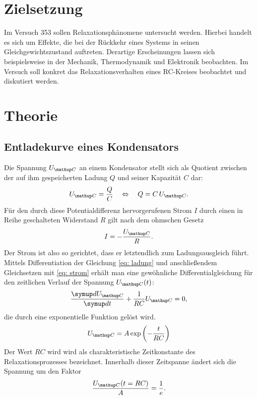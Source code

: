 \setcounter{page}{1}
\section*{Zielsetzung}
Im Versuch 353 sollen Relaxationsphänomene untersucht werden. Hierbei handelt es sich um Effekte, die bei der Rückkehr eines
Systems in seinen Gleichgewichtszustand auftreten. Derartige Erscheinungen lassen sich beispielsweise in der Mechanik, Thermodynamik
und Elektronik beobachten. Im Versuch soll konkret das Relaxationsverhalten eines RC-Kreises beobachtet und diskutiert werden.
\section{Theorie}
\subsection{Entladekurve eines Kondensators}
Die Spannung $U\ua{C}$ an einem Kondensator stellt sich als Quotient zwischen der auf ihm gespeicherten Ladung $Q$ und seiner Kapazität $C$ dar:
\begin{equation}
  U\ua{C} = \frac{Q}{C} \quad \Leftrightarrow \quad Q = C\, U\ua{C}.
  \label{eq: ladung}
\end{equation}
Für den durch diese Potentialdifferenz hervorgerufenen Strom $I$ durch einen in Reihe geschalteten Widerstand $R$ gilt nach dem ohmschen Gesetz
\begin{equation}
  I = -\frac{U\ua{C}}{R}.
  \label{eq: strom}
\end{equation}
Der Strom ist also so gerichtet, dass er letztendlich zum Ladungsausgleich führt. Mittels Differentiation der Gleichung \eqref{eq: ladung} und anschließendem
Gleichsetzen mit \eqref{eq: strom} erhält
man eine gewöhnliche Differentialgleichung für den zeitlichen Verlauf der Spannung $U\ua{C}(t)$:
\begin{equation}
  \frac{\dif{U\ua{C}}}{\dif{t}} + \frac{1}{RC}U\ua{C} = 0,
\end{equation}
die durch eine exponentielle Funktion gelöst wird.
\begin{equation}
  U\ua{C} = A \exp\left(-\frac{t}{RC}\right)
\end{equation}
Der Wert $RC$ wird wird als charakteristische Zeitkonstante des Relaxationsprozesses bezeichnet. Innerhalb dieser Zeitspanne ändert
sich die Spannung um den Faktor
\begin{equation}
  \frac{U\ua{C}(t = RC)}{A} = \frac{1}{e}.
\end{equation}
